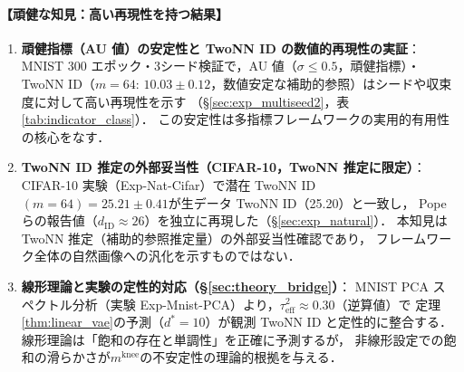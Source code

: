 \documentclass[11pt,a4paper]{jsarticle}
\newcommand{\mknee}{m^{\mathrm{knee}}}
\begin{document}
\paragraph{【頑健な知見：高い再現性を持つ結果】}
\begin{enumerate}
  \item \textbf{頑健指標（AU 値）の安定性と TwoNN ID の数値的再現性の実証}：
        MNIST 300 エポック・3シード検証で，AU 値（$\sigma \leq 0.5$，頑健指標）・
        TwoNN ID（$m=64$: $10.03 \pm 0.12$，数値安定な補助的参照）はシードや収束度に対して高い再現性を示す
        （§\ref{sec:exp_multiseed2}，表\ref{tab:indicator_class}）．
        この安定性は多指標フレームワークの実用的有用性の核心をなす．
  \item \textbf{TwoNN ID 推定の外部妥当性（CIFAR-10，TwoNN 推定に限定）}：
        CIFAR-10 実験（Exp-Nat-Cifar）で潜在 TwoNN ID$(m=64)=25.21\pm0.41$が生データ TwoNN ID（25.20）と一致し，
        Pope ら\cite{pope2021intrinsic}の報告値（$d_\mathrm{ID} \approx 26$）を独立に再現した（§\ref{sec:exp_natural}）．
        本知見は TwoNN 推定（補助的参照推定量）の外部妥当性確認であり，
        フレームワーク全体の自然画像への汎化を示すものではない．
  \item \textbf{線形理論と実験の定性的対応（§\ref{sec:theory_bridge}）}：
        MNIST PCA スペクトル分析（実験 Exp-Mnist-PCA）より，$\tau^2_\mathrm{eff} \approx 0.30$（逆算値）で
        定理\ref{thm:linear_vae}の予測（$d^*=10$）が観測 TwoNN ID と定性的に整合する．
        線形理論は「飽和の存在と単調性」を正確に予測するが，
        非線形設定での飽和の滑らかさが$\mknee$の不安定性の理論的根拠を与える．
\end{enumerate}
\end{document}
